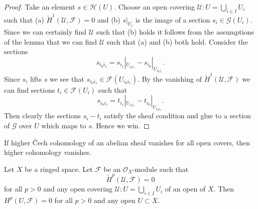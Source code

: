 \begin{proof}
Take an element $s \in \mathcal{H}(U)$. Choose an open covering
$\mathcal{U} : U = \bigcup_{i \in I} U_i$ such that
(a) $\check{H}^1(\mathcal{U}, \mathcal{F}) = 0$ and (b)
$s|_{U_i}$ is the image of a section $s_i \in \mathcal{G}(U_i)$.
Since we can certainly find $\mathcal{U}$ such that (b) holds
it follows from the assumptions of the lemma that we can find
$\mathcal{U}$ such that (a) and (b) both hold.
Consider the sections
$$
s_{i_0i_1} = s_{i_1}|_{U_{i_0i_1}} - s_{i_0}|_{U_{i_0i_1}}.
$$
Since $s_i$ lifts $s$ we see that $s_{i_0i_1} \in \mathcal{F}(U_{i_0i_1})$.
By the vanishing of $\check{H}^1(\mathcal{U}, \mathcal{F})$ we can
find sections $t_i \in \mathcal{F}(U_i)$ such that
$$
s_{i_0i_1} = t_{i_1}|_{U_{i_0i_1}} - t_{i_0}|_{U_{i_0i_1}}.
$$
Then clearly the sections $s_i - t_i$ satisfy the sheaf condition
and glue to a section of $\mathcal{G}$ over $U$ which maps to $s$.
Hence we win.
\end{proof}

\begin{lemma}
\label{lemma-cech-vanish}
\begin{slogan}
If higher {\v C}ech cohomology of an abelian sheaf vanishes for all open covers,
then higher cohomology vanishes.
\end{slogan}
Let $X$ be a ringed space.
Let $\mathcal{F}$ be an $\mathcal{O}_X$-module such that
$$
\check{H}^p(\mathcal{U}, \mathcal{F}) = 0
$$
for all $p > 0$ and any open covering $\mathcal{U} : U = \bigcup_{i \in I} U_i$
of an open of $X$. Then $H^p(U, \mathcal{F}) = 0$ for all $p > 0$
and any open $U \subset X$.
\end{lemma}

